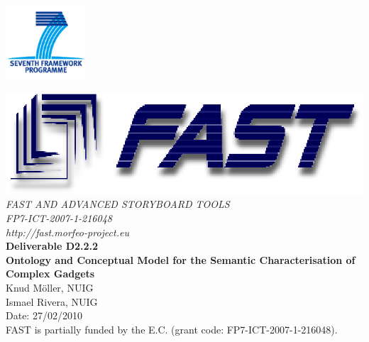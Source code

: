 \documentclass{fast_latex}
\newcommand\deliverableNumber{D2.2.2}
\newcommand\deliverableTitle{Ontology and Conceptual Model for the Semantic Characterisation of Complex Gadgets}
\newcommand\authorOne{Knud M\"oller, NUIG}
\newcommand\authorTwo{Ismael Rivera, NUIG}
\begin{document}

\def\note#1{\marginpar{\footnotesize#1}} %



\thispagestyle{empty}


\begin{flushright}
	\includegraphics[width=3cm]{images/FP7_logo}
\end{flushright}

\vspace{1cm}

	\begin{center}
		\includegraphics{images/FAST_logo}\\
		\vspace{1cm}
		{\LARGE{\sffamily \emph{FAST AND ADVANCED STORYBOARD TOOLS}}}\\
		\vspace{0.5cm}
		{\LARGE \sffamily \emph{FP7-ICT-2007-1-216048}}\\
		\vspace{0.5cm}
		{\LARGE \sffamily \emph{http://fast.morfeo-project.eu}}\\
		\vspace{4cm}
		{\LARGE \sffamily \textbf{Deliverable \deliverableNumber}}\\
		\vspace{0.5cm}
		{\LARGE \sffamily \textbf{\deliverableTitle}}\\
		\vspace{2cm}
		{\large \sffamily \authorOne}\\
		{\large \sffamily \authorTwo}\\
		\vspace{0.5cm}
		\vfill
		{\large \sffamily Date: 27/02/2010}\\
		\vspace{1cm}
		{\sffamily FAST is partially funded by the E.C. (grant code: FP7-ICT-2007-1-216048).}
		
	\end{center}
\end{document}
